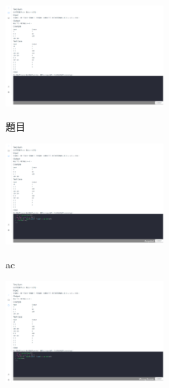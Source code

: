 \documentclass[12pt]{article}
\begin{document}
\begin{enumerate}
    \begin{figure}[htb]
      \centering
      \begin{subfigure}{0.45\linewidth}
        \centering
        \href{https://raw.githubusercontent.com/programingtw/proglearn-plan/main/img/testcode.png}{
          \includegraphics[width=0.65\textwidth]{./img/testcode.png}
        }
        \caption{題目}
        \label{arc10}            
      \end{subfigure}
      \begin{subfigure}{0.45\linewidth}
        \centering
        \href{https://raw.githubusercontent.com/programingtw/proglearn-plan/main/img/hw_ac.png}{
          \includegraphics[width=0.65\textwidth]{./img/hw_ac.png}
        }
        \caption{ac}
        \label{arc11}
      \end{subfigure}
      \bigskip
      \begin{subfigure}{0.45\linewidth}
        \centering
        \href{https://raw.githubusercontent.com/programingtw/proglearn-plan/main/img/hw_wa.png}{
          \includegraphics[width=0.65\textwidth]{./img/hw_wa.png}
}
\end{subfigure}
\end{figure}
\end{enumerate}
\end{document}
